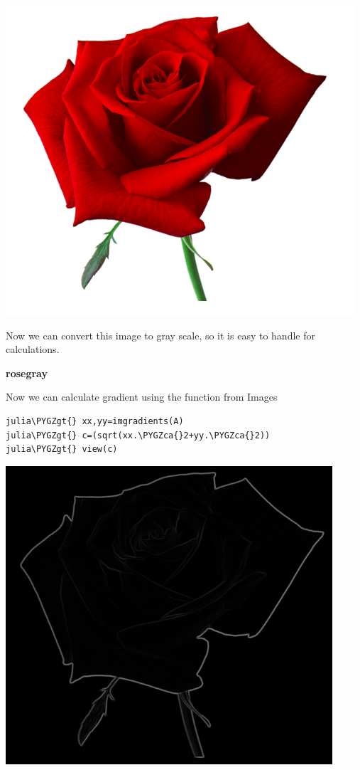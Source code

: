 \documentclass[letterpaper,10pt,english]{sphinxmanual}
\def\PYGZca{\char`\^}
\def\PYGZgt{\char`\>}
\begin{document}
\includegraphics{rose.png}

Now we can convert this image to gray scale, so it is easy to handle for calculations.

{\color{red}\bfseries{}\textbar{}rosegray\textbar{}}

Now we can calculate gradient using the function from Images

\begin{Verbatim}[commandchars=\\\{\}]
julia\PYGZgt{} xx,yy=imgradients(A)
julia\PYGZgt{} c=(sqrt(xx.\PYGZca{}2+yy.\PYGZca{}2))
julia\PYGZgt{} view(c)
\end{Verbatim}

\includegraphics{gradient.png}
\end{document}
